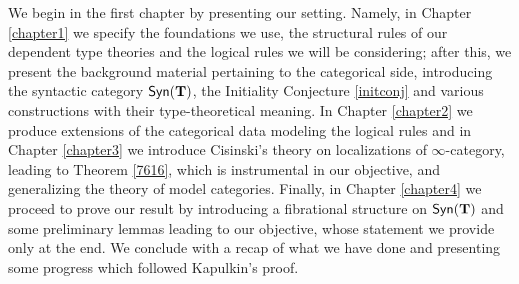 \begin{organization}
  We begin in the first chapter by presenting our setting. Namely, in
  Chapter \ref{chapter1} we specify the foundations we use, the structural rules of our
  dependent type theories and the logical rules we will be considering; after
  this, we present the background material pertaining to the categorical side,
  introducing the syntactic category $\mathsf{Syn}(\mathbf{T})$, the Initiality Conjecture
  \ref{initconj} and various constructions
  with their type-theoretical meaning. In Chapter \ref{chapter2} we produce
  extensions of the categorical data modeling the logical rules and in Chapter
  \ref{chapter3} we introduce Cisinski's theory on localizations of
  $\infty$-category, leading to Theorem \ref{7616}, which is instrumental in our
  objective, and generalizing the theory of model categories. Finally, in
  Chapter \ref{chapter4} we proceed to prove our result by introducing a
  fibrational structure on $\mathsf{Syn}(\mathbf{T})$ and some preliminary lemmas leading to our
  objective, whose statement we provide only at the end. We conclude with a
  recap of what we have done and presenting some progress which followed
  Kapulkin's proof.
\end{organization}
